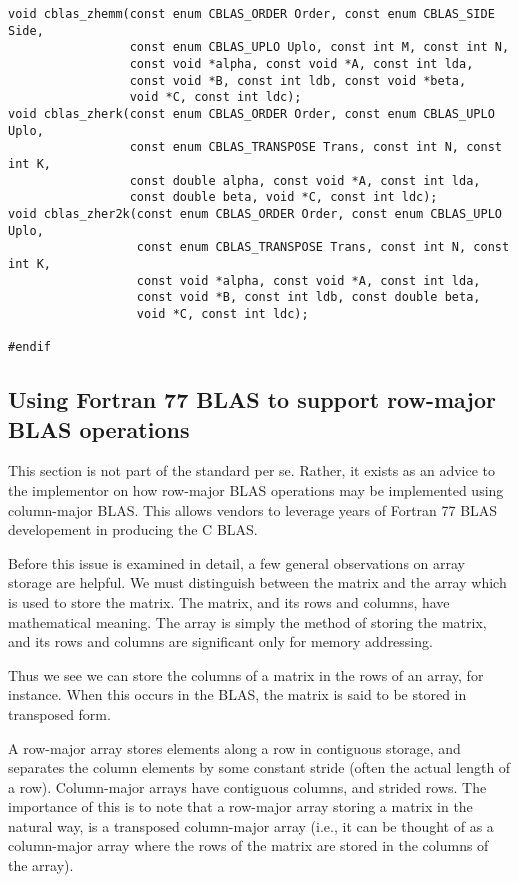 \documentclass{article}
\begin{document}
\begin{Verbatim}[fontsize=\small,fontfamily=tt,fontshape=rm]
void cblas_zhemm(const enum CBLAS_ORDER Order, const enum CBLAS_SIDE Side,
                 const enum CBLAS_UPLO Uplo, const int M, const int N,
                 const void *alpha, const void *A, const int lda,
                 const void *B, const int ldb, const void *beta,
                 void *C, const int ldc);
void cblas_zherk(const enum CBLAS_ORDER Order, const enum CBLAS_UPLO Uplo,
                 const enum CBLAS_TRANSPOSE Trans, const int N, const int K,
                 const double alpha, const void *A, const int lda,
                 const double beta, void *C, const int ldc);
void cblas_zher2k(const enum CBLAS_ORDER Order, const enum CBLAS_UPLO Uplo,
                  const enum CBLAS_TRANSPOSE Trans, const int N, const int K,
                  const void *alpha, const void *A, const int lda,
                  const void *B, const int ldb, const double beta,
                  void *C, const int ldc);

#endif
\end{Verbatim}

\subsection{Using Fortran 77 BLAS to support row-major BLAS operations}
\label{app-ArrayStore}


This section is not part of the standard per se.  Rather, it exists as an
advice to the implementor on how row-major BLAS operations may be 
implemented using column-major BLAS.  This allows vendors to leverage
years of Fortran 77 BLAS developement in producing the C BLAS.

Before this issue is examined in detail, a few general observations on array
storage are helpful.  We must distinguish between the matrix and the array
which is used to store the matrix.  The matrix, and its rows and columns,
have mathematical meaning.  The array is simply the method of storing the
matrix, and its rows and columns are significant only for memory addressing.

Thus we see we can store the columns of a matrix in the rows of an array,
for instance.  When this occurs in the BLAS, the matrix is said to be
stored in transposed form.

A row-major array stores elements along a row in contiguous storage, and
separates the column elements by some constant stride (often the actual
length of a row).  Column-major arrays have contiguous columns, and strided
rows.  The importance of this is to note that a row-major array storing
a matrix in the natural way, is a transposed column-major array (i.e.,
it can be thought of as a column-major array where the rows of the matrix
are stored in the columns of the array).
\end{document}

